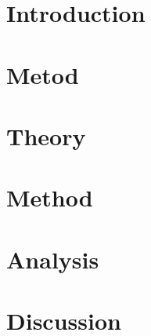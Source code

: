 \section{Introduction}
\parencite{dekker2011complexity}
\parencite{dekker2011complexity}

\section{Metod}


\section{Theory} 


\section{Method}


\section{Analysis}

\section{Discussion}